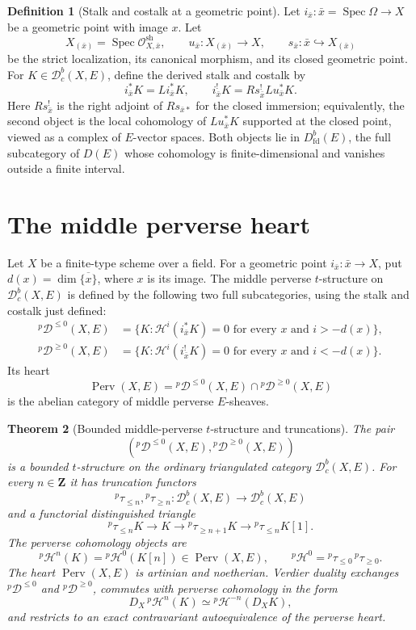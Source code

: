 \documentclass[10pt]{article}
\newtheorem{theorem}{Theorem}[section]
\theoremstyle{definition}
\newtheorem{definition}[theorem]{Definition}
\newcommand{\Db}{\mathcal D}
\newcommand{\Dbc}{\mathcal D^b_c}
\newcommand{\Spec}{\operatorname{Spec}}
\newcommand{\Perv}{\operatorname{Perv}}
\begin{document}
\begin{definition}[Stalk and costalk at a geometric point]
Let \(i_{\bar x}:\bar x=\Spec\Omega\to X\) be a geometric point with image
\(x\).  Let
\[
 X_{(\bar x)}=\Spec\mathcal O^{\mathrm{sh}}_{X,\bar x},
 \qquad
 u_{\bar x}:X_{(\bar x)}\longrightarrow X,
 \qquad
 s_{\bar x}:\bar x\hookrightarrow X_{(\bar x)}
\]
be the strict localization, its canonical morphism, and its closed geometric
point.  For \(K\in\Dbc(X,E)\), define the derived stalk and costalk by
\[
 i_{\bar x}^*K=Li_{\bar x}^*K,
 \qquad
 i_{\bar x}^!K=Rs_{\bar x}^!Lu_{\bar x}^*K.
\]
Here \(Rs_{\bar x}^!\) is the right adjoint of
\(Rs_{\bar x*}\) for the closed immersion; equivalently, the second object
is the local cohomology of \(Lu_{\bar x}^*K\) supported at the closed point,
viewed as a complex of \(E\)-vector spaces.  Both objects lie in
\(D^b_{\mathrm{fd}}(E)\), the full subcategory of \(D(E)\) whose cohomology
is finite-dimensional and vanishes outside a finite interval.
\end{definition}

\section{The middle perverse heart}

Let \(X\) be a finite-type scheme over a field.  For a geometric point
\(i_{\bar x}:\bar x\to X\), put
\(d(x)=\dim\overline{\{x\}}\), where \(x\) is its image.  The middle
perverse \(t\)-structure on \(\Dbc(X,E)\) is defined by the following two
full subcategories, using the stalk and costalk just defined:
\[
 \begin{aligned}
 {}^p\Db^{\le0}(X,E)
 &=\{K:\mathcal H^i(i_{\bar x}^*K)=0
       \text{ for every }x\text{ and }i>-d(x)\},\\
 {}^p\Db^{\ge0}(X,E)
 &=\{K:\mathcal H^i(i_{\bar x}^!K)=0
       \text{ for every }x\text{ and }i<-d(x)\}.
 \end{aligned}
\]
Its heart
\[
 \Perv(X,E)={}^p\Db^{\le0}(X,E)\cap{}^p\Db^{\ge0}(X,E)
\]
is the abelian category of middle perverse \(E\)-sheaves.

\begin{theorem}[Bounded middle-perverse \(t\)-structure and truncations]
The pair
\[
 \left({}^p\Db^{\le0}(X,E),{}^p\Db^{\ge0}(X,E)\right)
\]
is a bounded \(t\)-structure on the ordinary triangulated category
\(\Dbc(X,E)\).  For every \(n\in\mathbf Z\) it has truncation functors
\[
 {}^p\tau_{\le n},{}^p\tau_{\ge n}:\Dbc(X,E)\longrightarrow\Dbc(X,E)
\]
and a functorial distinguished triangle
\[
 {}^p\tau_{\le n}K\longrightarrow K\longrightarrow
 {}^p\tau_{\ge n+1}K\longrightarrow{}^p\tau_{\le n}K[1].
\]
The perverse cohomology objects are
\[
 {}^p\mathcal H^n(K)={}^p\mathcal H^0(K[n])\in\Perv(X,E),
 \qquad
 {}^p\mathcal H^0={}^p\tau_{\le0}\,{}^p\tau_{\ge0}.
\]
The heart \(\Perv(X,E)\) is artinian and noetherian.  Verdier duality
exchanges \({}^p\Db^{\le0}\) and \({}^p\Db^{\ge0}\), commutes with
perverse cohomology in the form
\[
 D_X\,{}^p\mathcal H^n(K)\simeq{}^p\mathcal H^{-n}(D_XK),
\]
and restricts to an exact contravariant autoequivalence of the perverse
heart.
\end{theorem}
\end{document}
